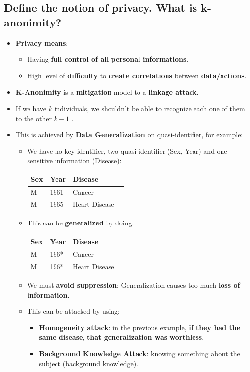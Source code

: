 \documentclass[9pt, letterpaper]{article}
\begin{document}
\subsection{Define the notion of privacy. What is k-anonimity?}
\begin{itemize}
	\item \textbf{Privacy means}:
	\begin{itemize}
		\item Having \textbf{full control of all personal informations}.
		\item High level of \textbf{difficulty} to \textbf{create correlations} between \textbf{data/actions}.
	\end{itemize}
	\item \textbf{K-Anonimity} is a \textbf{mitigation} model to a \textbf{linkage attack}.
	\item If we have $k$ individuals, we shouldn't be able to recognize each one of them to the other $k-1$ .
	\item This is achieved by \textbf{Data Generalization} on quasi-identifier, for example:
	\begin{itemize}
		\item We have no key identifier, two quasi-identifier (Sex, Year) and one sensitive information (Disease):
		\begin{center}
			\begin{tabular}{| C{1cm} | C{5cm} | C{5cm} | C{5cm} |}
			\hline
 			\textbf{Sex} & \textbf{Year} & \textbf{Disease} \\  \hline
 			M & 1961 & Cancer \\
 			M & 1965 & Heart Disease \\
 			\hline
			\end{tabular}
		\end{center}
		\item This can be \textbf{generalized} by doing:
		\begin{center}
			\begin{tabular}{| C{1cm} | C{5cm} | C{5cm} | C{5cm} |}
			\hline
 			\textbf{Sex} & \textbf{Year} & \textbf{Disease} \\  \hline
 			M & 196* & Cancer \\
 			M & 196* & Heart Disease \\
 			\hline
			\end{tabular}
		\end{center}
		\item We must \textbf{avoid suppression}: Generalization causes too much \textbf{loss of information}.
		\item This can be attacked by using:
		\begin{itemize}
			\item \textbf{Homogeneity attack}: in the previous example, \textbf{if they had the same disease}, \textbf{that generalization was worthless}.
			\item \textbf{Background Knowledge Attack}: knowing something about the subject (background knowledge).
		\end{itemize}
	\end{itemize}
\end{itemize}
\end{document}
